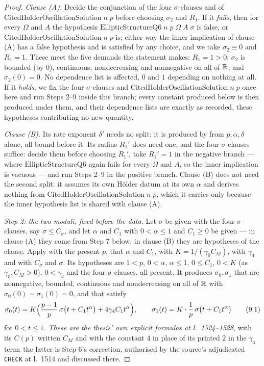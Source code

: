 \begin{proof}
\emph{Clause \textup{(A)}.}  Decide the conjunction of the four
$\sigma$-clauses and of $\mathrm{CitedHolderOscillationSolution}\;n\;p$ before
choosing $\sigma_2$ and $R_1$.  If it \emph{fails}, then for every $\Omega$ and
$A$ the hypothesis
$\mathrm{EllipticStructureQ6}\;n\;p\;\Omega\;A\;\sigma$ is false, or
$\mathrm{CitedHolderOscillationSolution}\;n\;p$ is; either way the inner
implication of clause (A) has a false hypothesis and is satisfied by any choice,
and we take $\sigma_2\equiv0$ and $R_1=1$.  These meet the five demands the
statement makes: $R_1=1>0$; $\sigma_2$ is bounded (by $0$), continuous,
nondecreasing and nonnegative on all of $\mathbb{R}$; and $\sigma_2(0)=0$.  No
dependence list is affected, $0$ and $1$ depending on nothing at all.  If it
\emph{holds}, we fix the four $\sigma$-clauses and
$\mathrm{CitedHolderOscillationSolution}\;n\;p$ once here and run Steps 2--9
inside this branch; every constant produced below is then produced under them,
and their dependence lists are exactly as recorded, these hypotheses
contributing no new quantity.

\emph{Clause \textup{(B)}.}  Its rate exponent $\delta'$ needs no split: it is
produced by  from $p,\alpha,\delta$ alone,
all bound before it.  Its radius $R_1'$ does need one, and the four
$\sigma$-clauses suffice: decide them before choosing $R_1'$, take $R_1'=1$ in
the negative branch --- where $\mathrm{EllipticStructureQ6}$ again fails for
every $\Omega$ and $A$, so the inner implication is vacuous --- and run Steps
2--9 in the positive branch.  Clause (B) does not need the second split: it
assumes its own H\"older datum at its own $\alpha$ and derives nothing from
$\mathrm{CitedHolderOscillationSolution}\;n\;p$, which it carries only because
the inner hypothesis list is shared with clause (A).

\medskip
\noindent\emph{Step 2: the two moduli, fixed before the data.}  Let
$\sigma$ be given with the four $\sigma$-clauses, say $\sigma\le C_\sigma$, and
let $\alpha$ and $C_1$ with $0<\alpha\le1$ and $C_1\ge0$ be given --- in clause
(A) they come from Step 7 below, in clause (B) they are hypotheses of the clause.
Apply  with the present $p$, that $\alpha$
and $C_1$, with $K=1/(\gamma_0C_M)$, with $\gamma_4$ and with $C_\sigma$ and
$\sigma$.  Its hypotheses are $1<p$, $0<\alpha$, $\alpha\le1$, $0\le C_1$,
$0<K$ (as $\gamma_0,C_M>0$), $0<\gamma_4$ and the four $\sigma$-clauses, all
present.  It produces $\sigma_0,\sigma_1$ that are nonnegative, bounded,
continuous and nondecreasing on all of $\mathbb{R}$ with
$\sigma_0(0)=\sigma_1(0)=0$, and that satisfy
\[
\sigma_0(t)=K\Bigl(\frac{p-1}p\,\sigma\bigl(t+C_1t^{\alpha}\bigr)
+4\gamma_4C_1t^{\alpha}\Bigr),
\qquad
\sigma_1(t)=K\cdot\frac1p\,\sigma\bigl(t+C_1t^{\alpha}\bigr)
\tag{9.1}
\]
for $0<t\le1$.  \emph{These are the thesis' own explicit formulas at
l.~1524--1528}, with its $C(p)$ written $C_M$ and with the constant $4$ in place
of its printed $2$ in the $\gamma_4$ term; the latter is Step 6's correction,
authorised by the source's adjudicated \texttt{CHECK} at l.~1514 and discussed
there.


\end{proof}
